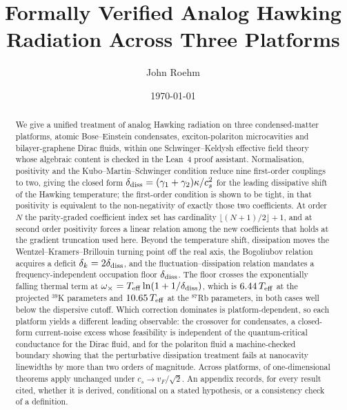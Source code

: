 \documentclass[aps,prd,reprint,nofootinbib,superscriptaddress]{revtex4-2}
\begin{document}
\title{Formally Verified Analog Hawking Radiation Across Three Platforms}

\author{John Roehm}

\date{\today}

\begin{abstract}
We give a unified treatment of analog Hawking radiation on three
condensed-matter platforms, atomic Bose--Einstein condensates,
exciton-polariton microcavities and bilayer-graphene Dirac fluids, within
one Schwinger--Keldysh effective field theory whose algebraic content is
checked in the Lean~4 proof assistant. Normalisation, positivity and the
Kubo--Martin--Schwinger condition reduce nine first-order couplings to
two, giving the closed form
$\delta_{\rm diss} = (\gamma_1+\gamma_2)\kappa/c_s^2$ for the leading
dissipative shift of the Hawking temperature; the first-order condition
is shown to be tight, in that positivity is equivalent to the
non-negativity of exactly those two coefficients. At order $N$ the
parity-graded coefficient index set has cardinality
$\lfloor (N{+}1)/2\rfloor + 1$, and at second order positivity forces a
linear relation among the new coefficients that holds at the gradient
truncation used here. Beyond the temperature shift, dissipation moves the
Wentzel--Kramers--Brillouin turning point off the real axis, the
Bogoliubov relation acquires a deficit $\delta_k = 2\delta_{\rm diss}$,
and the fluctuation--dissipation relation mandates a
frequency-independent occupation floor $\delta_{\rm diss}$. The floor
crosses the exponentially falling thermal term at
$\omega_\times = T_{\rm eff}\ln(1+1/\delta_{\rm diss})$, which is
$6.44\,T_{\rm eff}$ at the projected $^{39}$K parameters and
$10.65\,T_{\rm eff}$ at the $^{87}$Rb parameters, in both cases well below
the dispersive cutoff. Which correction dominates is platform-dependent,
so each platform yields a different leading observable: the crossover for
condensates, a closed-form current-noise excess whose feasibility is
independent of the quantum-critical conductance for the Dirac fluid, and
for the polariton fluid a machine-checked boundary showing that the
perturbative dissipation treatment fails at nanocavity linewidths by more
than two orders of magnitude. Across platforms,
\reuseTransferred{} of \reusePopulation{} one-dimensional theorems apply
unchanged under $c_s \to v_F/\sqrt{2}$. An appendix records, for every
result cited, whether it is derived, conditional on a stated hypothesis,
or a consistency check of a definition.
\end{abstract}
\end{document}
